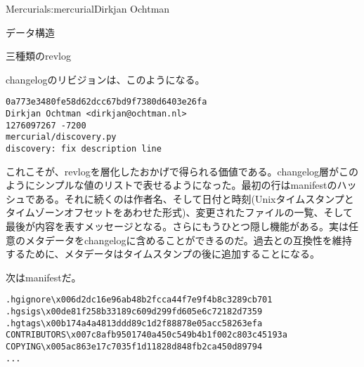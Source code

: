 \begin{aosachapter}{Mercurial}{s:mercurial}{Dirkjan Ochtman}
\begin{aosasect1}{データ構造}
\begin{aosasect2}{三種類のrevlog}

changelogのリビジョンは、このようになる。

\begin{verbatim}
0a773e3480fe58d62dcc67bd9f7380d6403e26fa
Dirkjan Ochtman <dirkjan@ochtman.nl>
1276097267 -7200
mercurial/discovery.py
discovery: fix description line
\end{verbatim}

\noindent これこそが、revlogを層化したおかげで得られる価値である。changelog層がこのようにシンプルな値のリストで表せるようになった。最初の行はmanifestのハッシュである。それに続くのは作者名、そして日付と時刻(Unixタイムスタンプとタイムゾーンオフセットをあわせた形式)、変更されたファイルの一覧、そして最後が内容を表すメッセージとなる。さらにもうひとつ隠し機能がある。実は任意のメタデータをchangelogに含めることができるのだ。過去との互換性を維持するために、メタデータはタイムスタンプの後に追加することになる。

次はmanifestだ。

\begin{verbatim}
.hgignore\x006d2dc16e96ab48b2fcca44f7e9f4b8c3289cb701
.hgsigs\x00de81f258b33189c609d299fd605e6c72182d7359
.hgtags\x00b174a4a4813ddd89c1d2f88878e05acc58263efa
CONTRIBUTORS\x007c8afb9501740a450c549b4b1f002c803c45193a
COPYING\x005ac863e17c7035f1d11828d848fb2ca450d89794
...
\end{verbatim}


\end{aosasect2}
\end{aosasect1}
\end{aosachapter}
